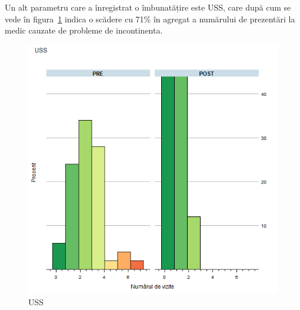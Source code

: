 \documentclass[12pt]{article}
\begin{document}
  Un alt parametru care a înregistrat o îmbunatățire este \acf{USS}, care după cum se vede în figura~\ref{fig:incoResUSS} indica o scădere cu 71\% în agregat a numărului de prezentări la medic cauzate de probleme de incontinenta.
  \begin{figure}[H]
    \centering
    \includegraphics[width=0.8\linewidth]{incoResUSS}
    \caption{\acf{USS}}
    \label{fig:incoResUSS}
  \end{figure}
  
\end{document}
